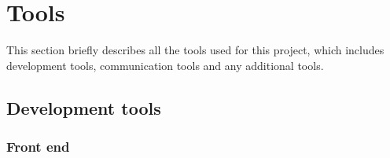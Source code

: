 
\chapter{Tools}

This section briefly describes all the tools used for this project, which includes development tools, communication tools and any additional tools.

\section{Development tools}

\subsection{Front end}
